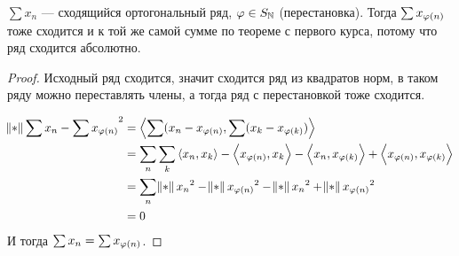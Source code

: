 \begin{consequence}
    $\sum x_n$ --- сходящийся ортогональный ряд, $\varphi \in S_{\mathbb{N}}$ (перестановка).
    Тогда $\sum x_{\varphi(n)}$ тоже сходится и к той же самой сумме по теореме с первого курса, потому что ряд сходится абсолютно.
\end{consequence}
\begin{proof}
    Исходный ряд сходится, значит сходится ряд из квадратов норм, в таком ряду можно переставлять члены, а тогда ряд с перестановкой тоже сходится.

    \begin{align*}
        \norm{\sum x_n - \sum x_{\vp(n)}}^2 & = \dotprod{\sum (x_n - x_{\vp(n)}}{\sum (x_k - x_{\vp(k)})}                                                                                 \\
                                            & = \sum\limits_n \sum\limits_k \dotprod{x_n}{x_k} - \dotprod{x_{\vp(n)}}{x_k} - \dotprod{x_n}{x_{\vp(k)}} + \dotprod{x_{\vp(n)}}{x_{\vp(k)}} \\
                                            & = \sum\limits_n \norm{x_n}^2 - \norm{x_{\vp(n)}}^2 - \norm{x_n}^2 + \norm{x_{\vp(n)}}^2                                                     \\
                                            & = 0
    \end{align*}
    И тогда $\sum x_n = \sum x_{\varphi(n)}$.
\end{proof}

\newpage

